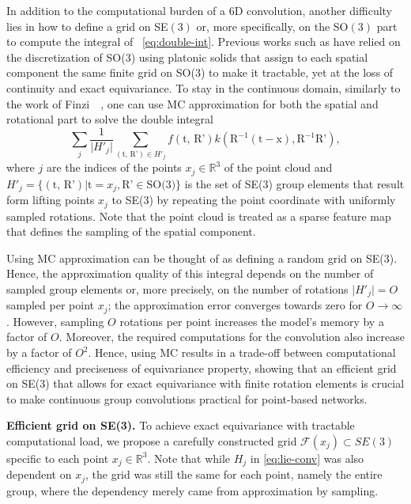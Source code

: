 In addition to the computational burden of a 6D convolution, another difficulty lies in how to define a grid on SE$(3)$ or, more specifically, on the SO$(3)$ part to compute the integral of ~\cref{eq:double-int}. 
Previous works such as \cite{zhu2023e2pn, chen2021equivariant} have relied on the discretization of SO(3) using platonic solids that assign to each spatial component the same finite grid on SO(3) to make it tractable, yet at the loss of continuity and exact equivariance.
To stay in the continuous domain, similarly to the work of Finzi~\etal~\cite{finzi2020generalizing}, one can use \ac{MC} approximation for both the spatial and rotational part to solve the double integral
\begin{equation}
    \sum_{j} \frac{1}{\lvert H'_j \rvert}\sum_{(\text{t, R'})\in H'_j}  f(\text{t, R'})k(\text{R}^{-1}(\text{t} - \text{x}), \text{R}^{-1}\text{R'}),
    \label{eq:lie-conv}
\end{equation}
\noindent where $j$ are the indices of the points $x_j \in \mathbb{R}^3$ of the point cloud
and $H'_j = \{(\text{t, R'}) | \text{t}=x_j, \text{R'}\in \text{SO(3)}\}$ is the set of SE(3) group elements that result form lifting points $x_j$ to SE(3) by repeating the point coordinate with uniformly sampled rotations. Note that the point cloud is treated as a sparse feature map that defines the sampling of the spatial component.







 Using \ac{MC} approximation can be thought of as defining a random grid on SE(3). Hence, the approximation quality of this integral depends on the number of sampled group elements or, more precisely, on the number of rotations $\lvert H'_j \rvert = O$ sampled per point $x_j$; the approximation error converges towards zero for $O \rightarrow \infty$.
However, sampling $O$ rotations per point increases the model's memory by a factor of $O$.
Moreover, the required computations for the convolution also increase by a factor of $O^2$. Hence, using \ac{MC} results in a trade-off between computational efficiency and preciseness of equivariance property, showing that an efficient grid on SE(3) that allows for exact equivariance with finite rotation elements is crucial to make continuous group convolutions practical for point-based networks.


\textbf{Efficient grid on SE(3).}
To achieve exact equivariance with tractable computational load, we propose a carefully constructed grid $\mathcal{F}(x_j) \subset SE(3)$ specific to each point $x_j \in \mathbb{R}^3$.
Note that while $H_j$ in \cref{eq:lie-conv} was also dependent on $x_j$, the grid was still the same for each point, namely the entire group, where the dependency merely came from approximation by sampling.

